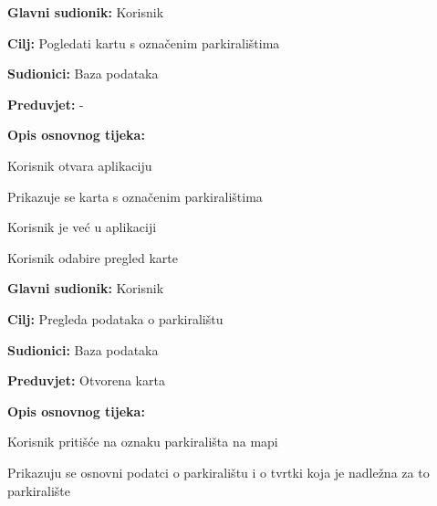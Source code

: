 \noindent {}
\begin{packed_item}
	
	\item \textbf{Glavni sudionik: } Korisnik
	\item \textbf{Cilj:} Pogledati kartu s označenim parkiralištima
	\item \textbf{Sudionici:} Baza podataka
	\item \textbf{Preduvjet:} -
	\item \textbf{Opis osnovnog tijeka:}
	
	\item[] \begin{packed_enum}
		
		\item Korisnik otvara aplikaciju
		\item Prikazuje se karta s označenim parkiralištima

	\end{packed_enum}
	
	\item[] \begin{packed_item}
	
		\item[1.a] Korisnik je već u aplikaciji
		\item[] \begin{packed_enum}
			
			\item Korisnik odabire pregled karte
			
	    \end{packed_enum}
    \end{packed_item}
\end{packed_item}

\noindent {}
\begin{packed_item}
	
	\item \textbf{Glavni sudionik:} Korisnik
	\item \textbf{Cilj:} Pregleda podataka o parkiralištu
	\item \textbf{Sudionici:} Baza podataka
	\item \textbf{Preduvjet:} Otvorena karta
	\item \textbf{Opis osnovnog tijeka:}
	
	\item[] \begin{packed_enum}
		
		\item Korisnik pritišće na oznaku parkirališta na mapi
		\item Prikazuju se osnovni podatci o parkiralištu i o tvrtki koja je nadležna za to parkiralište

	\end{packed_enum}
\end{packed_item}


